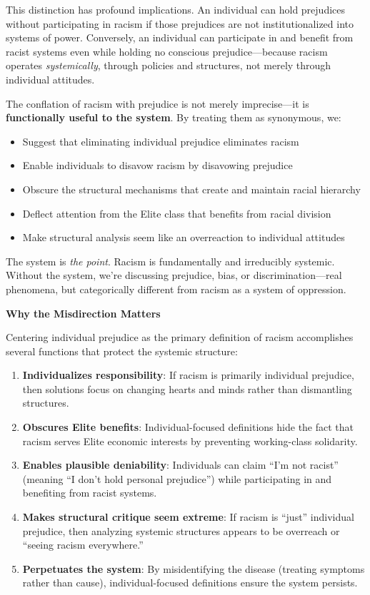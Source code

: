 \documentclass[12pt]{article}
\begin{document}
This distinction has profound implications. An individual can hold prejudices without participating in racism if those prejudices are not institutionalized into systems of power. Conversely, an individual can participate in and benefit from racist systems even while holding no conscious prejudice---because racism operates \textit{systemically}, through policies and structures, not merely through individual attitudes.

The conflation of racism with prejudice is not merely imprecise---it is \textbf{functionally useful to the system}. By treating them as synonymous, we:
\begin{itemize}
    \item Suggest that eliminating individual prejudice eliminates racism
    \item Enable individuals to disavow racism by disavowing prejudice
    \item Obscure the structural mechanisms that create and maintain racial hierarchy
    \item Deflect attention from the Elite class that benefits from racial division
    \item Make structural analysis seem like an overreaction to individual attitudes
\end{itemize}

The system is \textit{the point}. Racism is fundamentally and irreducibly systemic. Without the system, we're discussing prejudice, bias, or discrimination---real phenomena, but categorically different from racism as a system of oppression.

\textbf{Why the Misdirection Matters}

Centering individual prejudice as the primary definition of racism accomplishes several functions that protect the systemic structure:

\begin{enumerate}
    \item \textbf{Individualizes responsibility}: If racism is primarily individual prejudice, then solutions focus on changing hearts and minds rather than dismantling structures.
    
    \item \textbf{Obscures Elite benefits}: Individual-focused definitions hide the fact that racism serves Elite economic interests by preventing working-class solidarity.
    
    \item \textbf{Enables plausible deniability}: Individuals can claim ``I'm not racist'' (meaning ``I don't hold personal prejudice'') while participating in and benefiting from racist systems.
    
    \item \textbf{Makes structural critique seem extreme}: If racism is ``just'' individual prejudice, then analyzing systemic structures appears to be overreach or ``seeing racism everywhere.''
    
    \item \textbf{Perpetuates the system}: By misidentifying the disease (treating symptoms rather than cause), individual-focused definitions ensure the system persists.
\end{enumerate}
\end{document}
